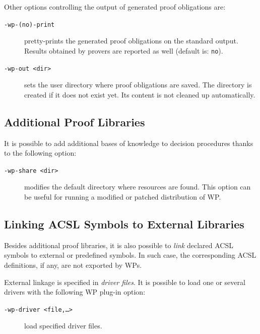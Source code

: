 Other options controlling the output of generated proof
obligations are:
\begin{description}
\item[\tt -wp-(no)-print] pretty-prints the generated proof obligations on
  the standard output. Results obtained by provers are reported as
  well (default is: \texttt{no}).
\item[\tt -wp-out <dir>] sets the user directory where proof
  obligations are saved. The directory is created if it does not exist
  yet. Its content is not cleaned up automatically.
\end{description}

\subsection{Additional Proof Libraries}
\label{prooflibs}

It is possible to add additional bases of knowledge to decision
procedures thanks to the following option:
\begin{description}
\item[\tt -wp-share <dir>] modifies the default directory where
  resources are found.  This option can be useful for running a modified or
  patched distribution of \textsf{WP}.
\end{description}

\subsection{Linking \textsf{ACSL} Symbols to External Libraries}
\label{drivers}

Besides additional proof libraries, it is also possible to
\emph{link} declared \textsf{ACSL} symbols to external or predefined
symbols. In such case, the corresponding \textsf{ACSL} definitions,
if any, are not exported by \textsf{WP}s.

External linkage is specified in \emph{driver files}. It is possible
to load one or several drivers with the following \textsf{WP} plug-in option:
\begin{description}
\item[\tt -wp-driver <file,\ldots>] load specified driver files.

\end{description}

